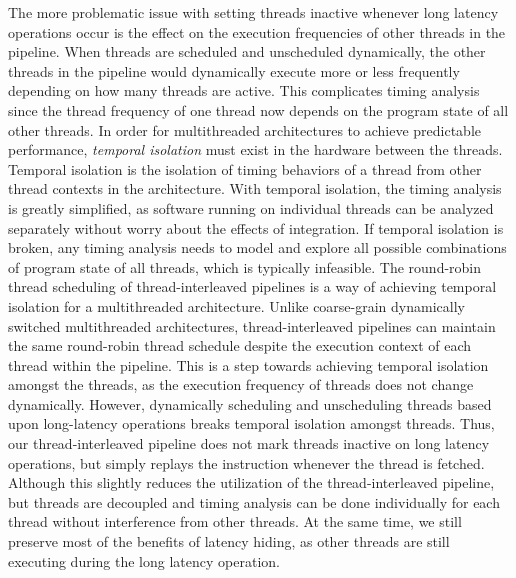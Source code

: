 The more problematic issue with setting threads inactive whenever long latency operations occur is the effect on the execution frequencies of other threads in the pipeline.
When threads are scheduled and unscheduled dynamically, the other threads in the pipeline would dynamically execute more or less frequently depending on how many threads are active.
This complicates timing analysis since the thread frequency of one thread now depends on the program state of all other threads. 
In order for multithreaded architectures to achieve predictable performance, \emph{temporal isolation} must exist in the hardware between the threads.
Temporal isolation is the isolation of timing behaviors of a thread from other thread contexts in the architecture.
With temporal isolation, the timing analysis is greatly simplified, as software running on individual threads can be analyzed separately without worry about the effects of integration. 
If temporal isolation is broken, any timing analysis needs to model and explore all possible combinations of program state of all threads, which is typically infeasible.
The round-robin thread scheduling of thread-interleaved pipelines is a way of achieving temporal isolation for a multithreaded architecture.
Unlike coarse-grain dynamically switched multithreaded architectures, thread-interleaved pipelines can maintain the same round-robin thread schedule despite the execution context of each thread within the pipeline. 
This is a step towards achieving temporal isolation amongst the threads, as the execution frequency of threads does not change dynamically.  
However, dynamically scheduling and unscheduling threads based upon long-latency operations breaks temporal isolation amongst threads.
Thus, our thread-interleaved pipeline does not mark threads inactive on long latency operations, but simply replays the instruction whenever the thread is fetched.  
Although this slightly reduces the utilization of the thread-interleaved pipeline, but threads are decoupled and timing analysis can be done individually for each thread without interference from other threads.
At the same time, we still preserve most of the benefits of latency hiding, as other threads are still executing during the long latency operation.


